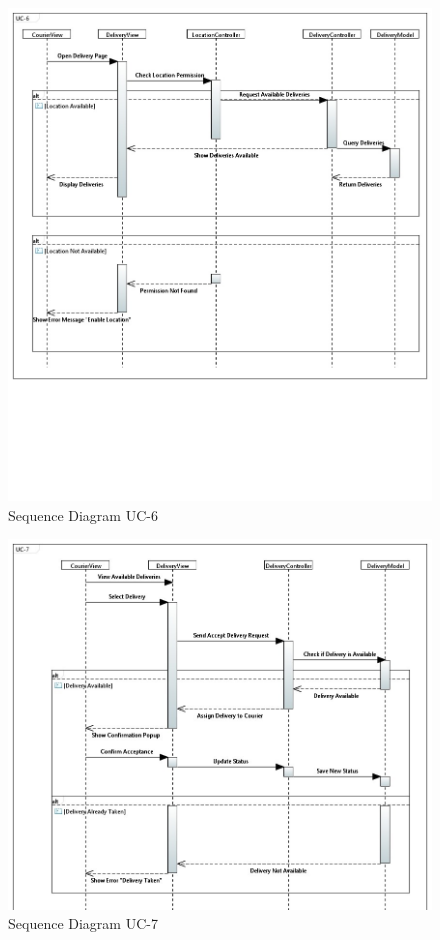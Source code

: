 \begin{figure}[h!]
\begin{center}
\includegraphics[scale=0.5]{FIGS/SD-UC-6.jpeg}
    \caption{Sequence Diagram UC-6}
    \label{fig:seq_diag3}
\end{center}
\end{figure}

\begin{figure}[h!]
\begin{center}
\includegraphics[scale=0.35]{FIGS/SD-UC-7.JPG}
    \caption{Sequence Diagram UC-7}
    \label{fig:seq_diag3}
\end{center}
\end{figure}

